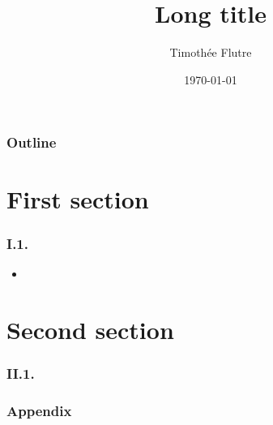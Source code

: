 \documentclass[t,handout]{beamer}
\title[Short title]{Long title}
\author[T. Flutre]{Timoth\'{e}e Flutre}
\institute[Short affiliation]{Long affiliation}
\date{\today}
\begin{document}
\begin{frame}
  \titlepage
\end{frame}                                                                                                                       

\begin{frame}
  \frametitle{Outline}
  \tableofcontents
\end{frame}

\section{First section}
\begin{frame}
  \frametitle{I.1.}
  \begin{itemize}
  \item 
  \end{itemize}
\end{frame}

\section{Second section}

\begin{frame}
  \frametitle{II.1.}
  \begin{center}
  \end{center}
\end{frame}

\appendix
{}
\setcounter{finalframe}{\value{framenumber}}

\begin{frame}
  \frametitle{Appendix}
\end{frame}

\setcounter{framenumber}{\value{finalframe}}
\end{document}
